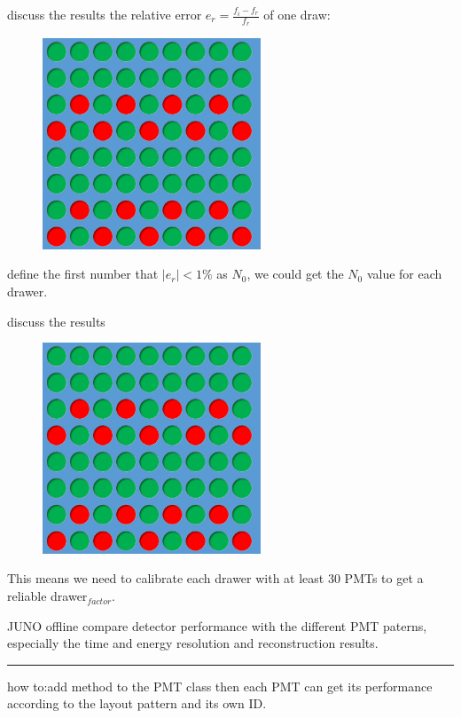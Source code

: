 \documentclass[11pt,compress,xcolor=x11names,UTF8]{beamer}
\begin{document}
\begin{frame}{discuss the results}
the relative error $e_{r}=\frac{f_{i}-f_{r}}{f_r}$ of one draw:
\begin{figure}
\centering
\includegraphics[width=0.58\textwidth]{pat4} %
\end{figure}
define the first number that $|e_r|<1\%$ as $N_0$, we could get the $N_0$ value for each drawer.
\end{frame}
\begin{frame}{discuss the results}
\begin{figure}
\centering
\includegraphics[width=0.58\textwidth]{pat4} %
\end{figure}
This means we need to calibrate each drawer with  at least 30 PMTs to get a reliable drawer$_{factor}$.
\end{frame}

\begin{frame}{ JUNO offline}
compare detector performance with the different PMT paterns, especially the time and energy resolution and reconstruction results.

\hrule{\textwidth}

how to:add method to the PMT class then each PMT can get its performance according to the layout pattern and its own ID. 
\end{frame}
\end{document}
